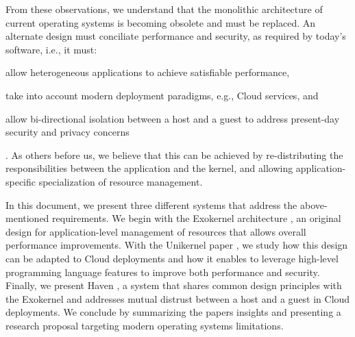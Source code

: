 From these observations, we understand that the monolithic architecture of current operating systems is becoming obsolete and must be replaced.
An alternate design must conciliate performance and security, as required by today's software, i.e., it must:
\begin{enumerate*}
	\item allow heterogeneous applications to achieve satisfiable performance,
	\item take into account modern deployment paradigms, e.g., Cloud services, and 
	\item allow bi-directional isolation between a host and a guest to address present-day security and privacy concerns
\end{enumerate*}.
As others before us\cite{DBLP:conf/sosp/EnglerKO95,DBLP:conf/hotos/EnglerK95,DBLP:conf/sosp/KaashoekEGBHMPGM97,DBLP:journals/tocs/CaoFKL96,DBLP:journals/sigops/HartyC92}, we believe that this can be achieved by re-distributing the responsibilities between the application and the kernel, and allowing application-specific specialization of resource management.

In this document, we present three different systems that address the above-mentioned requirements.
We begin with the Exokernel architecture \cite{DBLP:conf/sosp/EnglerKO95}, an original design for application-level management of resources that allows overall performance improvements.
With the Unikernel paper \cite{DBLP:conf/asplos/MadhavapeddyMRSSGSHC13}, we study how this design can be adapted to Cloud deployments and how it enables to leverage high-level programming language features to improve both performance and security.
Finally, we present Haven \cite{DBLP:journals/tocs/BaumannPH15}, a system that shares common design principles with the Exokernel and addresses mutual distrust between a host and a guest in Cloud deployments.
We conclude by summarizing the papers insights and presenting a research proposal targeting modern operating systems limitations.







